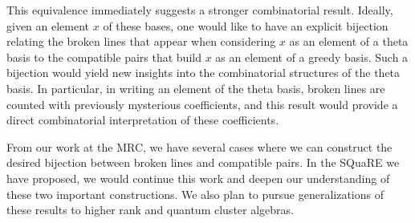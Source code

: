 \documentclass{amsart}
\begin{document}
    This equivalence immediately suggests a stronger combinatorial result.
    Ideally, given an element $x$ of these bases, one would like to have an
    explicit bijection relating the broken lines that appear when considering
    $x$ as an element of a theta basis to the compatible pairs that build $x$ as
    an element of a greedy basis.
    Such a bijection would yield new insights into the combinatorial structures
    of the theta basis.
    In particular, in writing an element of the theta basis, broken lines are
    counted with previously mysterious coefficients, and this result would
    provide a direct combinatorial interpretation of these coefficients.
    
    From our work at the MRC, we have several cases where we can construct the
    desired bijection between broken lines and compatible pairs.
    In the SQuaRE we have proposed, we would continue this work and deepen our
    understanding of these two important constructions.
    We also plan to pursue generalizations of these results to higher rank and
    quantum cluster algebras.
\end{document}
